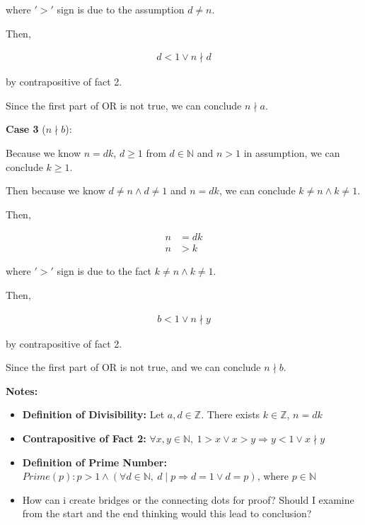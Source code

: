\documentclass[12pt]{article}
\begin{document}
\begin{enumerate}
\begin{mdframed}
        where $'>'$ sign is due to the assumption $d \neq n$.

        \bigskip

        Then,

        \begin{align}
            d < 1 \lor n \nmid d
        \end{align}

        by contrapositive of fact 2.

        \bigskip

        Since the first part of OR is not true, we can conclude $n \nmid a$.

        \bigskip

        \textbf{Case 3} ($n \nmid b$):

        Because we know $n = dk$, $d \geq 1$ from $d \in \mathbb{N}$ and $n > 1$ in
        assumption, we can conclude $k \geq 1$.

        \bigskip

        Then because we know $d \neq n \land d \neq 1$ and $n = dk$, we can conclude
        $k \neq n \land k \neq 1$.

        Then,

        \begin{align}
            n &= dk\\
            n &> k
        \end{align}

        where $'>'$ sign is due to the fact $k \neq n \land k \neq 1$.

        \bigskip

        Then,

        \begin{align}
            b < 1 \lor n \nmid y
        \end{align}

        by contrapositive of fact 2.

        \bigskip

        Since the first part of OR is not true, and we can conclude $n \nmid b$.

    \end{mdframed}

    \textbf{Notes:}
    \begin{itemize}
        \item \textbf{Definition of Divisibility:} Let $a,d \in \mathbb{Z}$.
        There exists $k \in \mathbb{Z}$, $n = dk$
        \item \textbf{Contrapositive of Fact 2:} $\forall x,y \in \mathbb{N},\:
        1 > x \lor x > y \Rightarrow y < 1 \lor x \nmid y$
        \item \textbf{Definition of Prime Number:} $Prime(p): p > 1 \land
        (\forall d \in \mathbb{N},\:d \mid p \Rightarrow d = 1 \lor d = p)$,
        where $p \in \mathbb{N}$
        \item How can i create bridges or the connecting dots for proof? Should
        I examine from the start and the end thinking would this lead to conclusion?


\end{itemize}
\end{enumerate}
\end{document}
